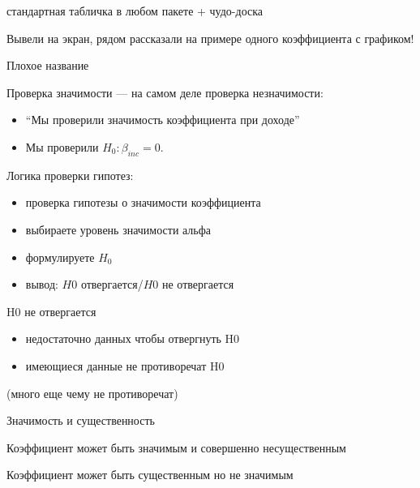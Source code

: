 \documentclass[ignorenonframetext,]{beamer}
\begin{document}
\begin{frame}{стандартная табличка в любом пакете + чудо-доска}

Вывели на экран, рядом рассказали на примере одного коэффициента с
графиком!

\end{frame}

\begin{frame}{Плохое название}

Проверка значимости --- на самом деле проверка незначимости:

\begin{itemize}
\item
  ``Мы проверили значимость коэффициента при доходе''
\item
  Мы проверили $H_0: \beta_{inc}=0$.
\end{itemize}

\end{frame}

\begin{frame}{Логика проверки гипотез:}

\begin{itemize}
\item
  проверка гипотезы о значимости коэффициента
\item
  выбираете уровень значимости альфа
\item
  формулируете $H_0$
\item
  вывод: $H0$ отвергается/$H0$ не отвергается
\end{itemize}

\end{frame}

\begin{frame}{H0 не отвергается}

\begin{itemize}
\item
  недостаточно данных чтобы отвергнуть H0
\item
  имеющиеся данные не противоречат H0
\end{itemize}

(много еще чему не противоречат)

\end{frame}

\begin{frame}{Значимость и существенность}

Коэффициент может быть значимым и совершенно несущественным

Коэффициент может быть существенным но не значимым

\end{frame}
\end{document}
